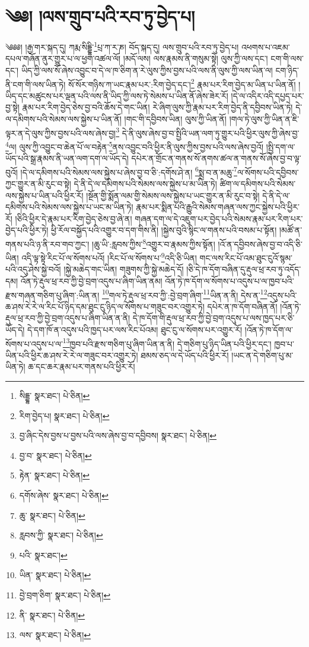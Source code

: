 \setcounter{footnote}{0} 
\chapter{༄༅། །ལས་གྲུབ་པའི་རབ་ཏུ་བྱེད་པ།}༄༅༅། །རྒྱ་གར་སྐད་དུ། ཀརྨ་སིདྡྷི་\footnote{སིདྡྷ་  སྣར་ཐང་།  པེ་ཅིན། }པྲ་ཀ་ར་ཎ། བོད་སྐད་དུ། ལས་གྲུབ་པའི་རབ་ཏུ་བྱེད་པ། འཕགས་པ་འཇམ་དཔལ་གཞོན་ནུར་གྱུར་པ་ལ་ཕྱག་འཚལ་ལོ། །མདོ་ལས། ལས་རྣམས་ནི་གསུམ་སྟེ། ལུས་ཀྱི་ལས་དང་། ངག་གི་ལས་དང་། ཡིད་ཀྱི་ལས་སོ་ཞེས་འབྱུང་བ་དེ་ལ་ཁ་ཅིག་ན་རེ་ལུས་ཀྱིས་བྱས་པའི་ལས་ནི་ལུས་ཀྱི་ལས་ཡིན་ལ། ངག་ཉིད་ནི་ངག་གི་ལས་ཡིན་ཏེ། སོ་སོར་གཉིས་ཀ་ཡང་རྣམ་པར་:རིག་བྱེད་དང་།\footnote{རིག་བྱེད་པ།  སྣར་ཐང་།  པེ་ཅིན། } རྣམ་པར་རིག་བྱེད་མ་ཡིན་པ་ཡིན་ནོ། །ཡིད་དང་མཚུངས་པར་ལྡན་པའི་ལས་ནི་ཡིད་ཀྱི་ལས་ཏེ་སེམས་པ་ཡིན་ནོ་ཞེས་ཟེར་རོ། །དེ་ལ་འདིར་འདི་དཔྱད་པར་བྱ་སྟེ། རྣམ་པར་རིག་བྱེད་ཅེས་བྱ་བའི་ཆོས་དེ་གང་ཡིན། རེ་ཞིག་ལུས་ཀྱི་རྣམ་པར་རིག་བྱེད་ནི་དབྱིབས་ཡིན་ཏེ། དེ་ལ་དམིགས་པའི་སེམས་ལས་སྐྱེས་པ་ཡིན་ནོ། །གང་གི་དབྱིབས་ཡིན། ལུས་ཀྱི་ཡིན་ནོ། །གལ་ཏེ་ལུས་ཀྱི་ཡིན་ན་ཇི་ལྟར་ན་དེ་ལུས་ཀྱིས་བྱས་པའི་ལས་ཞེས་བྱ།\footnote{བྱ་ཞིང་དེས་བྱས་པ་བྱས་པའི་ལས་ཞེས་བྱ་བ་དབྱིབས།  སྣར་ཐང་།  པེ་ཅིན། } དེ་ནི་ལུས་ཞེས་བྱ་བ་སྤྱིའི་ཡན་ལག་ཏུ་གྱུར་པའི་ཕྱིར་ལུས་ཀྱི་ཞེས་བྱ་\footnote{བྱ་བ་  སྣར་ཐང་།  པེ་ཅིན། }ལ། ལུས་ཀྱི་འབྱུང་བ་ཆེན་པོ་ལ་བརྟེན་\footnote{རྟེན་  སྣར་ཐང་།  པེ་ཅིན། }ནས་འབྱུང་བའི་ཕྱིར་ནི་ལུས་ཀྱིས་བྱས་པའི་ལས་ཞེས་བྱའོ། །སྤྱི་དག་ལ་ཡོད་པའི་སྒྲ་རྣམས་ནི་ཡན་ལག་དག་ལ་ཡོད་དེ། དཔེར་ན་གྲོང་ན་གནས་སོ་ནགས་ཚལ་ན་གནས་སོ་ཞེས་བྱ་བ་ལྟ་བུའོ། །དེ་ལ་དམིགས་པའི་སེམས་ལས་སྐྱེས་པ་ཞེས་བྱ་བ་ཅི་:དགོས་ཤེ་ན། \footnote{དགོས་ཞེས་  སྣར་ཐང་།  པེ་ཅིན། }སྨྲ་བ་ན་མཆུ་\footnote{ཆུ་  སྣར་ཐང་།  པེ་ཅིན། }ལ་སོགས་པའི་དབྱིབས་ཀྱང་གྱུར་ན་མི་རུང་བ་སྟེ། དེ་ནི་དེ་ལ་དམིགས་པའི་སེམས་ལས་སྐྱེས་པ་མ་ཡིན་ཏེ། ཚིག་ལ་དམིགས་པའི་སེམས་ལས་སྐྱེས་པ་ཡིན་པའི་ཕྱིར་རོ། །སྔོན་གྱི་སྨོན་ལམ་གྱི་སེམས་ལས་སྐྱེས་པ་ཡང་གྱུར་ན་མི་རུང་བ་སྟེ། དེ་ནི་དེ་ལ་དམིགས་པའི་སེམས་ལས་སྐྱེས་པ་ཡང་མ་ཡིན་ཏེ། རྣམ་པར་སྨིན་པའི་རྒྱུའི་སེམས་གཞན་ལས་ཀྱང་སྐྱེས་པའི་ཕྱིར་རོ། །ཅིའི་ཕྱིར་དེ་རྣམ་པར་རིག་བྱེད་ཅེས་བྱ་ཞེ་ན། གཞན་དག་ལ་དེ་འཇུག་པར་བྱེད་པའི་སེམས་རྣམ་པར་རིག་པར་བྱེད་པའི་ཕྱིར་ཏེ། ཕྱི་རོལ་བསྐྱོད་པའི་འགྱུར་བ་དག་གིས་ནི། །སྐྱེས་བུའི་སྙིང་ལ་གནས་པའི་བསམ་པ་སྟོན། །མཚོ་ན་གནས་པའི་ཉ་ནི་རབ་གབ་ཀྱང་། །ཆུ་ཡི་:རླབས་ཀྱིས་\footnote{རླབས་ཀྱི་  སྣར་ཐང་།  པེ་ཅིན། }འགྱུར་བ་རྣམས་ཀྱིས་སྟོན། །འོ་ན་དབྱིབས་ཞེས་བྱ་བ་འདི་ཅི་ཡིན། འདི་ལྟ་སྟེ་རིང་པོ་ལ་སོགས་པའོ། །རིང་པོ་ལ་སོགས་པ་\footnote{པའི་  སྣར་ཐང་། }འདི་ཅི་ཡིན། གང་ལས་རིང་པོ་འམ་ཐུང་ངུའོ་སྙམ་པའི་འདུ་ཤེས་སྐྱེ་བའོ། །སྐྱེ་མཆེད་གང་ཡིན། གཟུགས་ཀྱི་སྐྱེ་མཆེད་དོ། །ཅི་དེ་ཁ་དོག་བཞིན་དུ་རྡུལ་ཕྲ་རབ་ཏུ་འདོད་དམ། འོན་ཏེ་རྡུལ་ཕྲ་རབ་ཀྱི་བྱེ་བྲག་འདུས་པ་ཞིག་ཡིན་ནམ། འོན་ཏེ་ཁ་དོག་ལ་སོགས་པ་འདུས་པ་ལ་ཁྱབ་པའི་རྫས་གཞན་གཅིག་པུ་ཞིག་:ཡིན་ན། \footnote{ཡིན་  སྣར་ཐང་།  པེ་ཅིན། }གལ་ཏེ་རྡུལ་ཕྲ་རབ་ཀྱི་:བྱེ་བྲག་ཞིག་\footnote{བྱེ་བྲག་ཅིག་  སྣར་ཐང་།  པེ་ཅིན། }ཡིན་ན་ནི། དེས་ན་\footnote{ནི་  སྣར་ཐང་།  པེ་ཅིན། }འདུས་པའི་ཆ་ཤས་རེ་རེ་ལ་རིང་པོ་ཉིད་དམ་ཐུང་ངུ་ཉིད་ལ་སོགས་པ་གཟུང་བར་འགྱུར་ཏེ། དཔེར་ན་ཁ་དོག་བཞིན་ནོ། །འོན་ཏེ་རྡུལ་ཕྲ་རབ་ཀྱི་བྱེ་བྲག་འདུས་པ་ཞིག་ཡིན་ན་ནི། དེ་ཁ་དོག་གི་རྡུལ་ཕྲ་རབ་ཀྱི་བྱེ་བྲག་འདུས་པ་ལས་ཁྱད་པར་ཅི་ཡོད་དེ། དེ་དག་ཁོ་ན་འདུས་པའི་ཁྱད་པར་ལས་རིང་པོའམ། ཐུང་ངུ་ལ་སོགས་པར་འགྱུར་རོ། །འོན་ཏེ་ཁ་དོག་ལ་སོགས་པ་འདུས་པ་ལ་\footnote{ལས་  སྣར་ཐང་།  པེ་ཅིན། }ཁྱབ་པའི་རྫས་གཅིག་པུ་ཞིག་ཡིན་ན་ནི། དེ་གཅིག་པུ་ཉིད་ཡིན་པའི་ཕྱིར་དང་། ཁྱབ་པ་ཡིན་པའི་ཕྱིར་ཆ་ཤས་རེ་རེ་ལ་གཟུང་བར་འགྱུར་ཏེ། ཐམས་ཅད་ལ་དེ་ཡོད་པའི་ཕྱིར་རོ། །ཡང་ན་དེ་གཅིག་པུ་མ་ཡིན་ཏེ། ཆ་དང་ཆར་རྣམ་པར་གནས་པའི་ཕྱིར་རོ། 